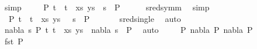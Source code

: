 \begin{isabellebody}
\ simp\isanewline
\ \ \isamarkupfalse%
\ {\isachardoublequoteopen}{\isasymexists}\ P{}{\isachardot}{\kern0pt}\ {\isacharparenleft}{\kern0pt}{\isacharparenleft}{\kern0pt}t{}\ {\isasymapprox}{\isacharquery}{\kern0pt}\ t{}{\isacharparenright}{\kern0pt}\ {\isacharhash}{\kern0pt}\ xs{\isacharcomma}{\kern0pt}\ ys{\isacharparenright}{\kern0pt}\ {\isasymturnstile}\ s{}\ {\isasymleadsto}\ P{}{\isachardoublequoteclose}\isanewline
\ \ \ \ \isamarkupfalse%
\ sred{\isacharunderscore}{\kern0pt}symm\ \isamarkupfalse%
\ simp\isanewline
\ \ \isamarkupfalse%
\ {\isachardoublequoteopen}{\isasymexists}\ P{}{\isachardot}{\kern0pt}\ {\isacharparenleft}{\kern0pt}{\isacharparenleft}{\kern0pt}t{}\ {\isasymapprox}{\isacharquery}{\kern0pt}\ t{}{\isacharparenright}{\kern0pt}\ {\isacharhash}{\kern0pt}\ xs{\isacharcomma}{\kern0pt}\ ys{\isacharparenright}{\kern0pt}\ {\isasymTurnstile}\ {\isacharparenleft}{\kern0pt}{\isacharbraceleft}{\kern0pt}{\isacharbraceright}{\kern0pt}{\isacharcomma}{\kern0pt}\ s{}{\isacharparenright}{\kern0pt}\ {\isasymRightarrow}\ P{}{\isachardoublequoteclose}\ \isanewline
\ \ \ \ \isamarkupfalse%
\ sred{\isacharunderscore}{\kern0pt}single\ \isamarkupfalse%
\ auto\isanewline
\ \ \isamarkupfalse%
\ \isamarkupfalse%
\ {\isachardoublequoteopen}{\isasymexists}nabla{}\ s{}\ P{}{\isachardot}{\kern0pt}\ {\isacharparenleft}{\kern0pt}{\isacharparenleft}{\kern0pt}t{}{\isacharcomma}{\kern0pt}\ t{}{\isacharparenright}{\kern0pt}\ {\isacharhash}{\kern0pt}\ xs{\isacharcomma}{\kern0pt}\ ys{\isacharparenright}{\kern0pt}\ {\isasymTurnstile}\ {\isacharparenleft}{\kern0pt}nabla{}{\isacharcomma}{\kern0pt}\ s{}{\isacharparenright}{\kern0pt}\ {\isasymRightarrow}\ P{}{\isachardoublequoteclose}\ \isamarkupfalse%
\ auto\isanewline
{}\isamarkupfalse%
\isanewline
\ \ \isamarkupfalse%
\ {\isacharparenleft}{\kern0pt}{}\ P{}\ nabla{}\ P{\isacharprime}{\kern0pt}\ nabla{}\ P{}{\isacharparenright}{\kern0pt}\isanewline
\ \ \isamarkupfalse%
\ {\isachardoublequoteopen}fst\ P{}\ {\isasymnoteq}\ {\isacharbrackleft}{\kern0pt}{\isacharbrackright}{\kern0pt}{\isachardoublequoteclose}\ \isamarkupfalse%

\end{isabellebody}
